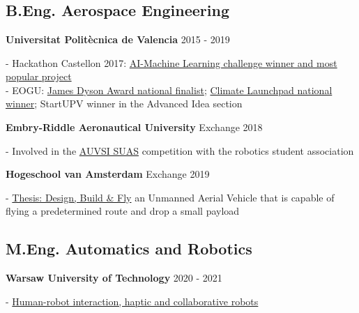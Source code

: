 \section*{\faInstitution} \label{sec:education}
 {}

\subsection{B.Eng. Aerospace Engineering}

\textbf{Universitat Politècnica de Valencia} \hfill 
{\footnotesize 2015 - 2019} \\
{
    \raggedright
    - Hackathon Castellon 2017:
    \href{https://www.upv.es/rtv/tv/actualidad-en-la-upv/59131}{AI-Machine
    Learning challenge winner and most popular project} \\
    - EOGU: \href{https://www.jamesdysonaward.org/2018/project/eogu/}{James
    Dyson Award national finalist};
    \href{http://www.upv.es/noticias-upv/noticia-10449-climatelaunchp-es.html}{Climate
    Launchpad national winner}; StartUPV winner in the Advanced Idea section
    \\
}

\textbf{Embry-Riddle Aeronautical University} \hfill 
{\footnotesize Exchange 2018} \\
{
    \raggedright
    - Involved in the \href{http://www.auvsi-suas.org/}{AUVSI SUAS} competition
    with the robotics student association \\
}


\textbf{Hogeschool van Amsterdam} \hfill 
{\footnotesize Exchange 2019} \\
{
    \raggedright
    -
    \href{https://1drv.ms/b/s!AqZvnCxLmXx9hL0wv02aRwBlym0cmA?e=0Wq9fF}{Thesis: Design,
    Build \& Fly} an Unmanned Aerial Vehicle that is capable of flying a
    predetermined route and drop a small payload \\
}

\subsection{M.Eng. Automatics and Robotics}

\textbf{Warsaw University of Technology} \hfill 
{\footnotesize 2020 - 2021} \\
{
    \raggedright
    -
    \href{https://www.linkedin.com/in/andreu-gimenez/overlay/education/674981675/multiple-media-viewer/?treasuryMediaId=1635461293122}{Human-robot
    interaction, haptic and collaborative robots} \\
}

